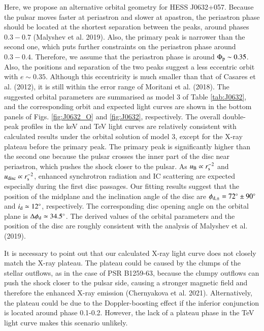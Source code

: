\documentclass{aa}
\def\HESSJ0632{HESS J0632+057}
\begin{document}
Here, we propose an alternative orbital geometry for \HESSJ0632.
Because the pulsar moves faster at periastron and slower at apastron, the periastron phase should be located at the shortest separation between the peaks, around phases $0.3-0.7$ (Malyshev et al. 2019). Also, the primary peak is narrower than the second one, which puts further constraints on the periastron phase around $0.3-0.4$. Therefore, we assume that the periastron phase is around $\Phi_{\rm p}\sim 0.35$.
Also, the positions and separation of the two peaks suggest a less eccentric orbit with $e\sim0.35$. Although this eccentricity is much smaller than that of Casares et al. (2012), it is still within the error range of Moritani et al. (2018). The suggested orbital parameters are summarised as model 3 of Table \ref{tab:J0632}, and the corresponding orbit and expected light curves are shown in the bottom panels of Figs. \ref{fig:J0632_O} and \ref{fig:J0632}, respectively. The overall double-peak profiles in the keV and TeV light curves are relatively consistent with calculated results under the orbital solution of model 3, except for the X-ray plateau before the primary peak. The primary peak is significantly higher than the second one because the pulsar crosses the inner part of the disc near periastron, which pushes the shock closer to the pulsar. As $u_{\rm B}\propto r_{\rm s}^{-2}$ and $u_{\rm disc}\propto r_{\rm s}^{-2}$, enhanced synchrotron radiation and IC scattering are expected especially during the first disc passages.
Our fitting results suggest that the position of the midplane and the inclination angle of the disc are $\phi_{\rm d,\pm}=72^{\circ}\pm 90^{\circ}$ and $i_{\rm d}\simeq 12^{\circ}$, respectively. The corresponding disc opening angle on the orbital plane is $\Delta\phi_{\rm d}\simeq 34.5^{\circ}$. The derived values of the orbital parameters and the position of the disc are roughly consistent with the analysis of Malyshev et al. (2019).

It is necessary to point out that our calculated X-ray light curve does not closely match the X-ray plateau. The plateau could be caused by the clumps of the stellar outflows, as in the case of PSR B1259-63, because the clumpy outflows can push the shock closer to the pulsar side, causing a stronger magnetic field and therefore the enhanced X-ray emission (Chernyakova et al. 2021). Alternatively, the plateau could be due to the Doppler-boosting effect if the inferior conjunction is located around phase 0.1-0.2. However, the lack of a plateau phase in the TeV light curve makes this scenario unlikely.
\end{document}
